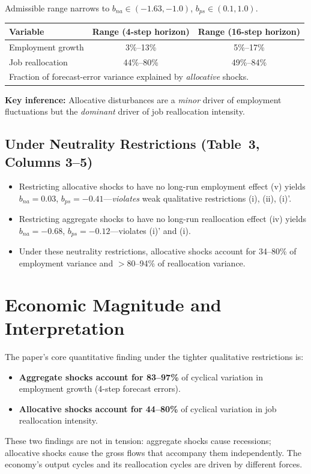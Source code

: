 Admissible range narrows to $b_{na}\in(-1.63,-1.0)$, $b_{ps}\in(0.1,1.0)$.
\begin{center}
\begin{tabular}{lcc}
\toprule
\textbf{Variable} & \textbf{Range (4-step horizon)} &
  \textbf{Range (16-step horizon)} \\
\midrule
Employment growth & 3\%--13\% & 5\%--17\% \\
Job reallocation & 44\%--80\% & 49\%--84\% \\
\bottomrule
\multicolumn{3}{l}{\small Fraction of forecast-error variance explained by
\emph{allocative} shocks.}
\end{tabular}
\end{center}

\textbf{Key inference:} Allocative disturbances are a \emph{minor} driver of
employment fluctuations but the \emph{dominant} driver of job reallocation
intensity.

\subsection*{Under Neutrality Restrictions (Table~3, Columns 3--5)}

\begin{itemize}
  \item Restricting allocative shocks to have no long-run employment effect
    (v) yields $b_{na}=0.03$, $b_{ps}=-0.41$---\emph{violates} weak
    qualitative restrictions (i), (ii), (i)'.
  \item Restricting aggregate shocks to have no long-run reallocation effect
    (iv) yields $b_{na}=-0.68$, $b_{ps}=-0.12$---violates (i)' and (i).
  \item Under these neutrality restrictions, allocative shocks account for
    34--80\% of employment variance and $>$80--94\% of reallocation variance.
\end{itemize}

\section{Economic Magnitude and Interpretation}

The paper's core quantitative finding under the tighter qualitative restrictions
is:
\begin{itemize}
  \item \textbf{Aggregate shocks account for 83--97\%} of cyclical variation
    in employment growth (4-step forecast errors).
  \item \textbf{Allocative shocks account for 44--80\%} of cyclical variation
    in job reallocation intensity.
\end{itemize}
These two findings are not in tension: aggregate shocks cause recessions;
allocative shocks cause the gross flows that accompany them independently.
The economy's output cycles and its reallocation cycles are driven by different
forces.

